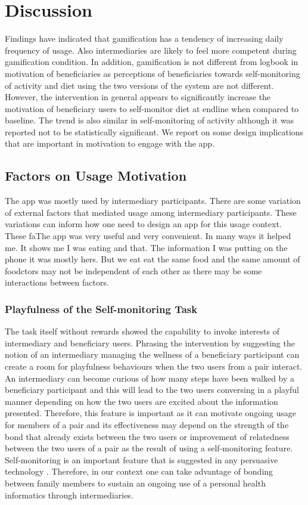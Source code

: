 \documentclass{sig-alternate}
\begin{document}
\section{Discussion}
Findings have indicated that gamification has a tendency of increasing daily frequency of usage. Also intermediaries are likely to feel more competent during gamification condition. In addition, gamification is not different from logbook in motivation of beneficiaries as perceptions of beneficiaries towards self-monitoring of activity and diet using the two versions of the system are not different. However, the intervention in general appears to significantly increase the motivation of beneficiary users to self-monitor diet at endline when compared to baseline. The trend is also similar in self-monitoring of activity although it was reported not to be statistically significant. We report on some design implications that are important in motivation to engage with the app.
\subsection{Factors on Usage Motivation}
The app was mostly used by intermediary participants. There are some variation of external factors that mediated usage among intermediary participants. These variations can inform how one need to design an app for this usage context. These faThe app was very useful and very convenient. In many ways it helped me.  It shows me I was eating and that. The information I was putting on the phone it was mostly hers. But we eat eat the same food and the same amount of foodctors may not be independent of each other as there may be some interactions between factors.
\subsubsection*{\textbf{Playfulness  of the Self-monitoring Task}} 
The task itself without rewards showed the capability to invoke interests of intermediary and beneficiary users. Phrasing the intervention by suggesting the notion of an intermediary managing the wellness of a beneficiary participant can create a room for playfulness behaviours when the two users from a pair interact. An intermediary can become curious of how many steps have been walked by a beneficiary participant and this will lead to the two users conversing in a playful manner depending on how the two users are excited about the information presented. Therefore, this feature is important as it can motivate ongoing usage for members of a pair and its effectiveness may depend on the strength of the bond that already exists between the two users or improvement of relatedness between the two users of a pair as the result of using a self-monitoring feature. Self-monitoring is an important feature that is suggested in any persuasive technology \cite{Oinas-kukkonen:psd}. Therefore, in our context one can take advantage of bonding between family members to sustain an ongoing use of a personal health informatics through intermediaries.  
\end{document}
